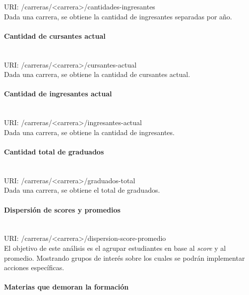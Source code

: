 URI: /carreras/<carrera>/cantidades-ingresantes \\

Dada una carrera, se obtiene la cantidad de ingresantes separadas por año.


\paragraph{Cantidad de cursantes actual}\mbox{}\\

URI: /carreras/<carrera>/cursantes-actual \\

Dada una carrera, se obtiene la cantidad de cursantes actual.


\paragraph{Cantidad de ingresantes actual}\mbox{}\\

URI: /carreras/<carrera>/ingresantes-actual \\

Dada una carrera, se obtiene la cantidad de ingresantes.


\paragraph{Cantidad total de graduados} \mbox{}\\

URI: /carreras/<carrera>/graduados-total \\

Dada una carrera, se obtiene el total de graduados.


\paragraph{Dispersión de scores y promedios}\mbox{}\\
URI: /carreras/<carrera>/dispersion-score-promedio \\

El objetivo de este análisis es el agrupar estudiantes en base al \textit{score} y al promedio. Mostrando grupos de interés sobre los cuales se podrán implementar acciones específicas.

\paragraph{Materias que demoran la formación}\mbox{}\\

